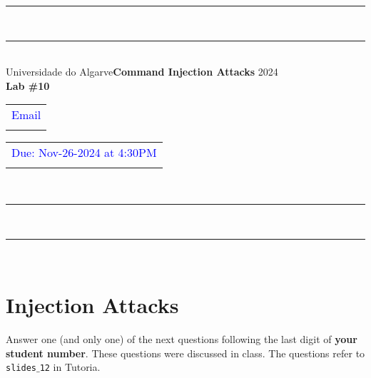 \documentclass{article}
\begin{document}
\begin{center}
\rule{\textwidth}{.0075in} \\
\rule[3mm]{\textwidth}{.0075in}\\

Universidade do Algarve\hfill \textbf{Command Injection Attacks} \hfill 2024\\[3ex]

{\Large\bf Lab \#10} \\[3ex]

\begin{tabular}{l}
\textcolor{blue}{Email} \\ \hfill 
\end{tabular}
\begin{tabular}{l}
\textcolor{blue}{Due: Nov-26-2024 at 4:30PM} \\ \hfill 
\end{tabular}\\

\rule{\textwidth}{.0075in} \\
\rule[3mm]{\textwidth}{.0075in} \\
\end{center}

\section*{Injection Attacks}
Answer one (and only one) of the next questions following the last
digit of \textbf{your student number}. These questions were discussed
in class. The questions refer to \texttt{slides$\_$12} in Tutoria.
\end{document}
